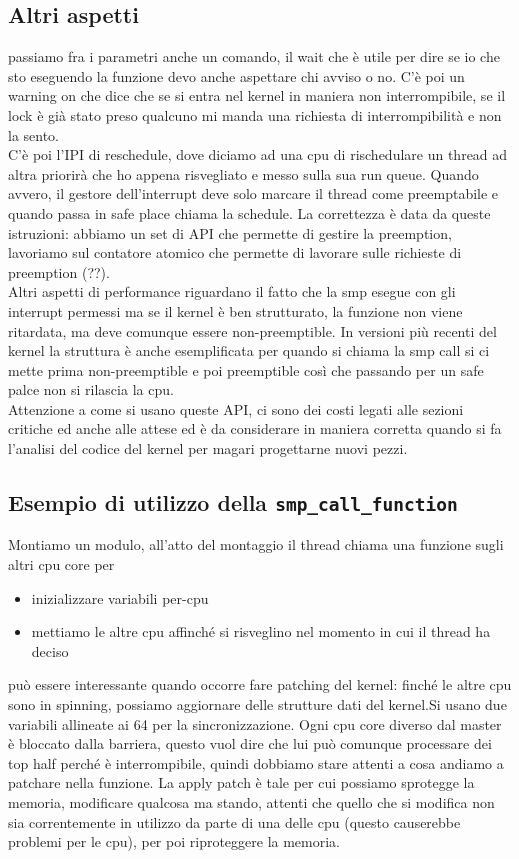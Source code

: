 \documentclass[12pt, oneside]{extbook}
\begin{document}
\subsection{Altri aspetti}
passiamo fra i parametri anche un comando, il wait che è utile per dire se io che sto eseguendo la funzione devo anche aspettare chi avviso o no. C'è poi un warning on che dice che se si entra nel kernel in maniera non interrompibile, se il lock è già stato preso qualcuno mi manda una richiesta di interrompibilità e non la sento.\\ C'è poi l'IPI di reschedule, dove diciamo ad una cpu di rischedulare un thread ad altra priorirà che ho appena risvegliato e messo sulla sua run queue. Quando avvero, il gestore dell'interrupt deve solo marcare il thread come preemptabile e quando passa in safe place chiama la schedule. La correttezza è data da queste istruzioni:
abbiamo un set di API che permette di gestire la preemption, lavoriamo sul contatore atomico che permette di lavorare sulle richieste di preemption (??).\\Altri aspetti di performance riguardano il fatto che la smp esegue con gli interrupt permessi ma se il kernel è ben strutturato, la funzione non viene ritardata, ma deve comunque essere non-preemptible. In versioni più recenti del kernel la struttura è anche esemplificata per quando si chiama la smp call si ci mette prima non-preemptible e poi preemptible così che passando per un safe palce non si rilascia la cpu.\\Attenzione a come si usano queste API, ci sono dei costi legati alle sezioni critiche ed anche alle attese ed è da considerare in maniera corretta quando si fa l'analisi del codice del kernel per magari progettarne nuovi pezzi.
\subsection*{Esempio di utilizzo della \texttt{smp\_call\_function}}
Montiamo un modulo, all'atto del montaggio il thread chiama una funzione sugli altri cpu core per
\begin{itemize}
\item inizializzare variabili per-cpu
\item mettiamo le altre cpu affinché si risveglino nel momento in cui il thread ha deciso
\end{itemize}
può essere interessante quando occorre fare patching del kernel: finché le altre cpu sono in spinning, possiamo aggiornare delle strutture dati del kernel.Si usano due variabili allineate ai 64 per la sincronizzazione. Ogni cpu core diverso dal master è bloccato dalla barriera, questo vuol dire che lui può comunque processare dei top half perché è interrompibile, quindi dobbiamo stare attenti a cosa andiamo a patchare nella funzione. La apply patch è tale per cui possiamo sprotegge la memoria, modificare qualcosa ma stando, attenti che quello che si modifica non sia correntemente in utilizzo da parte di una delle cpu (questo causerebbe problemi per le cpu), per poi riproteggere la memoria.
\end{document}

